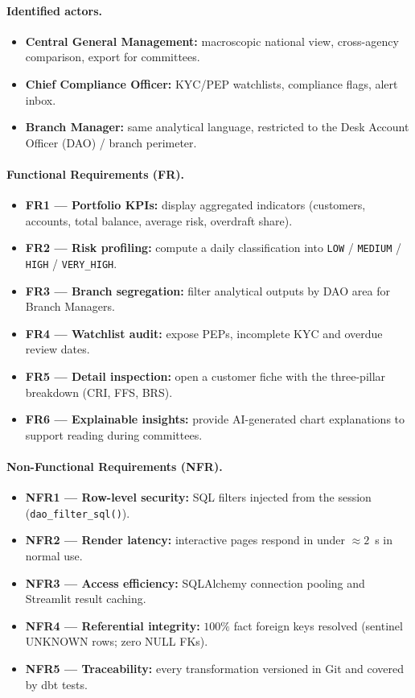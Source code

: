 \paragraph{Identified actors.}
\begin{itemize}
    \item \textbf{Central General Management:} macroscopic
          national view, cross-agency comparison, export for committees.
    \item \textbf{Chief Compliance Officer:} KYC/PEP
          watchlists, compliance flags, alert inbox.
    \item \textbf{Branch Manager:} same analytical language,
          restricted to the Desk Account Officer (DAO) / branch perimeter.
\end{itemize}

\paragraph{Functional Requirements (FR).}
\begin{itemize}
    \item \textbf{FR1 --- Portfolio KPIs:} display aggregated indicators (customers,
          accounts, total balance, average risk, overdraft share).
    \item \textbf{FR2 --- Risk profiling:} compute a daily classification into
          \texttt{LOW} / \texttt{MEDIUM} / \texttt{HIGH} / \texttt{VERY\_HIGH}.
    \item \textbf{FR3 --- Branch segregation:} filter analytical outputs by DAO area
          for Branch Managers.
    \item \textbf{FR4 --- Watchlist audit:} expose PEPs, incomplete KYC and overdue
          review dates.
    \item \textbf{FR5 --- Detail inspection:} open a customer fiche with the
          three-pillar breakdown (CRI, FFS, BRS).
    \item \textbf{FR6 --- Explainable insights:} provide AI-generated chart
          explanations to support reading during committees.
\end{itemize}

\paragraph{Non-Functional Requirements (NFR).}
\begin{itemize}
    \item \textbf{NFR1 --- Row-level security:} SQL filters injected from the session
          (\texttt{dao\_filter\_sql()}).
    \item \textbf{NFR2 --- Render latency:} interactive pages respond in under
          $\approx 2$~s in normal use.
    \item \textbf{NFR3 --- Access efficiency:} SQLAlchemy connection pooling and
          Streamlit result caching.
    \item \textbf{NFR4 --- Referential integrity:} $100\%$ fact foreign keys resolved
          (sentinel UNKNOWN rows; zero NULL FKs).
    \item \textbf{NFR5 --- Traceability:} every transformation versioned in Git and
          covered by dbt tests.
\end{itemize}

